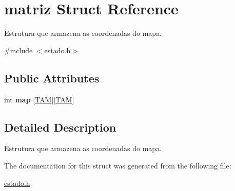\hypertarget{structmatriz}{}\section{matriz Struct Reference}
\label{structmatriz}


Estrutura que armazena as coordenadas do mapa.  




{\ttfamily \#include $<$estado.\+h$>$}

\subsection*{Public Attributes}
\begin{DoxyCompactItemize}
\item 
int {\bfseries map} \mbox{[}\hyperlink{estado_8h_ae0b4816fb45161ef9da5e6d6134ee28a}{T\+AM}\mbox{]}\mbox{[}\hyperlink{estado_8h_ae0b4816fb45161ef9da5e6d6134ee28a}{T\+AM}\mbox{]}\hypertarget{structmatriz_ae8cc1a3a105be9aa26cfc021e14384fc}{}\label{structmatriz_ae8cc1a3a105be9aa26cfc021e14384fc}

\end{DoxyCompactItemize}


\subsection{Detailed Description}
Estrutura que armazena as coordenadas do mapa. 

The documentation for this struct was generated from the following file\+:\begin{DoxyCompactItemize}
\item 
\hyperlink{estado_8h}{estado.\+h}\end{DoxyCompactItemize}
